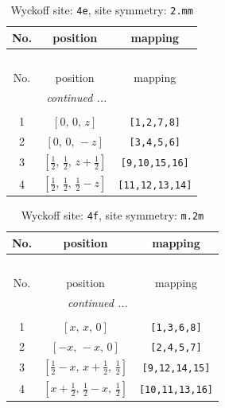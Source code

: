 \documentclass[fleqn,8pt]{jsarticle}
\begin{document}
\renewcommand{\arraystretch}{1.2}
\begin{longtable}{ccc}
\caption{Wyckoff site: {\tt 4e}, site symmetry: {\tt 2.mm}}
 \\
 \hline \hline
No. & position & mapping \\ \hline \endfirsthead

\multicolumn{2}{l}{\tablename\ \thetable{}} \\
 \hline \hline
No. & position & mapping \\ \hline \endhead

 \hline \hline
\multicolumn{2}{r}{\footnotesize\it continued ...} \\ \endfoot

 \hline \hline
\multicolumn{2}{r}{} \\ \endlastfoot

1 & $\left[ 0,\, 0,\, z \right]$ & {\tt [1,2,7,8]} \\ \hline
2 & $\left[ 0,\, 0,\, - z \right]$ & {\tt [3,4,5,6]} \\ \hline
3 & $\left[ \frac{1}{2},\, \frac{1}{2},\, z + \frac{1}{2} \right]$ & {\tt [9,10,15,16]} \\ \hline
4 & $\left[ \frac{1}{2},\, \frac{1}{2},\, \frac{1}{2} - z \right]$ & {\tt [11,12,13,14]} \\
\end{longtable}
\renewcommand{\arraystretch}{1.2}
\begin{longtable}{ccc}
\caption{Wyckoff site: {\tt 4f}, site symmetry: {\tt m.2m}}
 \\
 \hline \hline
No. & position & mapping \\ \hline \endfirsthead

\multicolumn{2}{l}{\tablename\ \thetable{}} \\
 \hline \hline
No. & position & mapping \\ \hline \endhead

 \hline \hline
\multicolumn{2}{r}{\footnotesize\it continued ...} \\ \endfoot

 \hline \hline
\multicolumn{2}{r}{} \\ \endlastfoot

1 & $\left[ x,\, x,\, 0 \right]$ & {\tt [1,3,6,8]} \\ \hline
2 & $\left[ - x,\, - x,\, 0 \right]$ & {\tt [2,4,5,7]} \\ \hline
3 & $\left[ \frac{1}{2} - x,\, x + \frac{1}{2},\, \frac{1}{2} \right]$ & {\tt [9,12,14,15]} \\ \hline
4 & $\left[ x + \frac{1}{2},\, \frac{1}{2} - x,\, \frac{1}{2} \right]$ & {\tt [10,11,13,16]} \\
\end{longtable}
\end{document}
